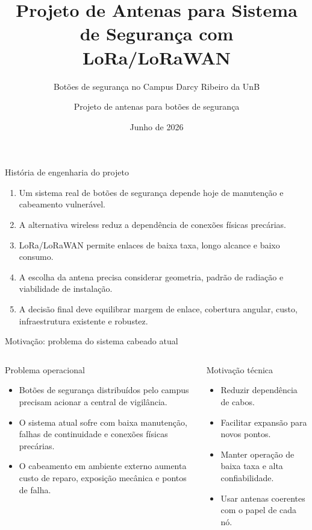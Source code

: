 \documentclass[aspectratio=169]{beamer}
\title[Antenas LoRa/LoRaWAN]{Projeto de Antenas para Sistema de Segurança com LoRa/LoRaWAN}
\subtitle{Botões de segurança no Campus Darcy Ribeiro da UnB}
\author{Projeto de antenas para botões de segurança}
\institute{Universidade de Brasília}
\date{Junho de 2026}
\begin{document}
\begin{frame}
  \titlepage
\end{frame}

\begin{frame}{História de engenharia do projeto}
\small
\begin{enumerate}
  \item Um sistema real de botões de segurança depende hoje de manutenção e cabeamento vulnerável.
  \item A alternativa wireless reduz a dependência de conexões físicas precárias.
  \item LoRa/LoRaWAN permite enlaces de baixa taxa, longo alcance e baixo consumo.
  \item A escolha da antena precisa considerar geometria, padrão de radiação e viabilidade de instalação.
  \item A decisão final deve equilibrar margem de enlace, cobertura angular, custo, infraestrutura existente e robustez.
\end{enumerate}
\end{frame}

\begin{frame}{Motivação: problema do sistema cabeado atual}
\small
\begin{columns}[T,onlytextwidth]
\begin{block}{Problema operacional}
\begin{itemize}
  \item Botões de segurança distribuídos pelo campus precisam acionar a central de vigilância.
  \item O sistema atual sofre com baixa manutenção, falhas de continuidade e conexões físicas precárias.
  \item O cabeamento em ambiente externo aumenta custo de reparo, exposição mecânica e pontos de falha.
\end{itemize}
\end{block}
\begin{block}{Motivação técnica}
\begin{itemize}
  \item Reduzir dependência de cabos.
  \item Facilitar expansão para novos pontos.
  \item Manter operação de baixa taxa e alta confiabilidade.
  \item Usar antenas coerentes com o papel de cada nó.
\end{itemize}
\end{block}
\end{columns}
\end{frame}
\end{document}
